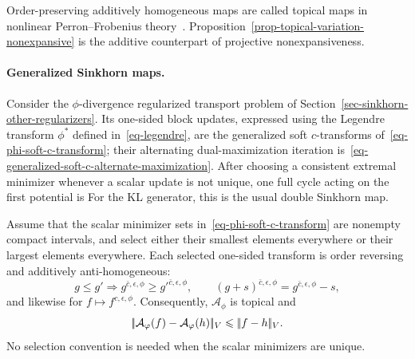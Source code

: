 \begin{rem}\label{rem-topical-maps}
	Order-preserving additively homogeneous maps are called topical maps in nonlinear Perron--Frobenius theory~\cite{lemmens2012nonlinear}. Proposition~\ref{prop-topical-variation-nonexpansive} is the additive counterpart of projective nonexpansiveness.
\end{rem}

\paragraph{Generalized Sinkhorn maps.}
Consider the $\phi$-divergence regularized transport problem of Section~\ref{sec-sinkhorn-other-regularizers}. Its one-sided block updates, expressed using the Legendre transform $\phi^*$ defined in~\eqref{eq-legendre}, are the generalized soft $c$-transforms of~\eqref{eq-phi-soft-c-transform}; their alternating dual-maximization iteration is~\eqref{eq-generalized-soft-c-alternate-maximization}. After choosing a consistent extremal minimizer whenever a scalar update is not unique, one full cycle acting on the first potential is
For the KL generator, this is the usual double Sinkhorn map.

\begin{prop}\label{prop-phi-double-soft-transform-monotone}
	Assume that the scalar minimizer sets in~\eqref{eq-phi-soft-c-transform} are nonempty compact intervals, and select either their smallest elements everywhere or their largest elements everywhere. Each selected one-sided transform is order reversing and additively anti-homogeneous:
	\[
		g\leq g'
		\Longrightarrow
		g^{\bar c,\epsilon,\phi}\geq {g'}^{\bar c,\epsilon,\phi},
		\qquad
		(g+s)^{\bar c,\epsilon,\phi}
		=
		g^{\bar c,\epsilon,\phi}-s,
	\]
	and likewise for $f\mapsto f^{c,\epsilon,\phi}$. Consequently, $\mathcal A_\phi$ is topical and
	\[
		|\!| \mathcal A_\varphi(f)-\mathcal A_\varphi(h) |\!|_V
		\leqslant
		|\!| f-h |\!|_V.
	\]
	No selection convention is needed when the scalar minimizers are unique.
\end{prop}

